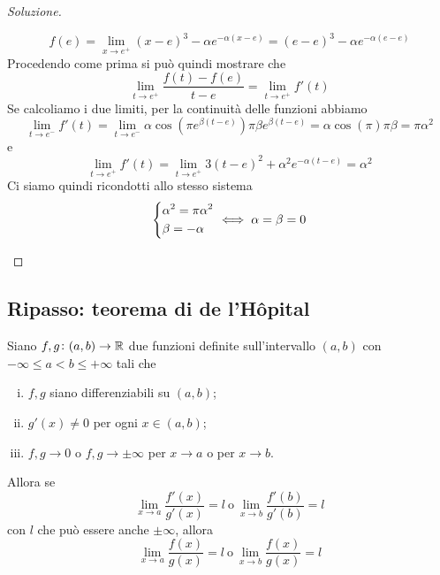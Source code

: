\begin{proof}[Soluzione]
\begin{enumerate}[(i)]
        \[
        f(e) = \lim_{x\to e^+} (x-e)^3-\alpha e^{-\alpha(x-e)} = (e-e)^3-\alpha e^{-\alpha(e-e)}
        \]
        Procedendo come prima si può quindi mostrare che
        \[
        \lim_{t\to e^+} \frac{f(t)-f(e)}{t-e} = \lim_{t\to e^+}f'(t)
        \]
        Se calcoliamo i due limiti, per la continuità delle funzioni abbiamo
        \[
        \lim_{t\to e^-}f'(t) = \lim_{t\to e^-} \alpha \cos(\pi e^{\beta(t-e)})\pi \beta e^{\beta(t-e)} = \alpha \cos(\pi) \pi \beta = \pi\alpha^2
        \]
        e 
        \[
        \lim_{t\to e^+} f'(t) = \lim_{t\to e^+} 3(t-e)^2 + \alpha^2 e^{-\alpha(t-e)} = \alpha^2
        \]
        Ci siamo quindi ricondotti allo stesso sistema
        \[
        \begin{dcases}
            \alpha^2 = \pi \alpha^2\\
            \beta = - \alpha
        \end{dcases} \iff \alpha=\beta = 0
        \]
    \end{enumerate}
\end{proof}
\subsection{Ripasso: teorema di de \texorpdfstring{l'H{\^o}pital}{l'Hôpital}}
\begin{theorem}
    \label{th:6.4}
    Siano $f,g\colon(a,b)\to\amsbb{R}$ due funzioni definite sull'intervallo $(a,b)$ con $-\infty \le a < b \le +\infty$ tali che
    \begin{enumerate}[(i)]
        \item $f,g$ siano differenziabili su $(a,b)$;
        \item $g'(x)\ne 0$ per ogni $x\in(a,b)$;
        \item $f, g \to 0$ o $f,g\to \pm \infty$ per $x\to a$ o per $x\to b$. 
    \end{enumerate}
    Allora se
    \[
    \lim_{x\to a} \frac{f'(x)}{g'(x)} = l \ \text{o} \ \lim_{x\to b} \frac{f'(b)}{g'(b)} = l
    \]
    con $l$ che può essere anche $\pm \infty$, allora
    \[
    \lim_{x\to a} \frac{f(x)}{g(x)} = l \ \text{o} \ \lim_{x\to b}\frac{f(x)}{g(x)} = l
    \]
\end{theorem}
